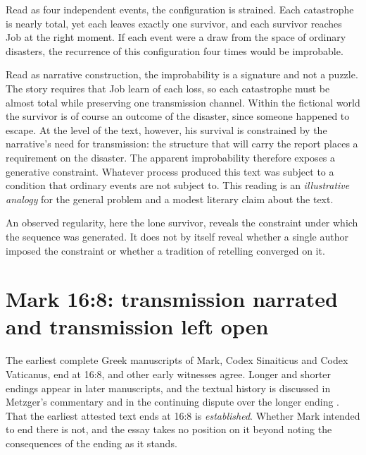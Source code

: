 \documentclass[11pt]{article}
\begin{document}
Read as four independent events, the configuration is strained. Each catastrophe is nearly total, yet each leaves exactly one survivor, and each survivor reaches Job at the right moment. If each event were a draw from the space of ordinary disasters, the recurrence of this configuration four times would be improbable.

Read as narrative construction, the improbability is a signature and not a puzzle. The story requires that Job learn of each loss, so each catastrophe must be almost total while preserving one transmission channel. Within the fictional world the survivor is of course an outcome of the disaster, since someone happened to escape. At the level of the text, however, his survival is constrained by the narrative's need for transmission: the structure that will carry the report places a requirement on the disaster. The apparent improbability therefore exposes a generative constraint. Whatever process produced this text was subject to a condition that ordinary events are not subject to. This reading is an \emph{illustrative analogy} for the general problem and a modest literary claim about the text.

An observed regularity, here the lone survivor, reveals the constraint under which the sequence was generated. It does not by itself reveal whether a single author imposed the constraint or whether a tradition of retelling converged on it.

\section{Mark 16:8: transmission narrated and transmission left open}

The earliest complete Greek manuscripts of Mark, Codex Sinaiticus and Codex Vaticanus, end at 16:8, and other early witnesses agree. Longer and shorter endings appear in later manuscripts, and the textual history is discussed in Metzger's commentary and in the continuing dispute over the longer ending \cite{metzger,head,snapp}. That the earliest attested text ends at 16:8 is \emph{established}. Whether Mark intended to end there is not, and the essay takes no position on it beyond noting the consequences of the ending as it stands.
\end{document}
